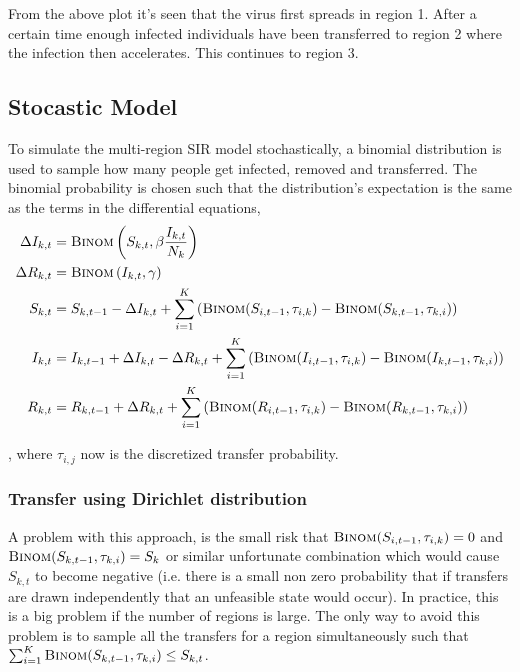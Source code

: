From the above plot it's seen that the virus first spreads in region 1. After a certain time enough infected individuals have been transferred to region 2 where the infection then accelerates. This continues to region 3.

\subsection{Stocastic Model}

To simulate the multi-region SIR model stochastically, a binomial distribution is used to sample how many people get infected, removed and transferred. The binomial probability is chosen such that the distribution's expectation is the same as the terms in the differential equations,
\begin{equation*}
\begin{aligned}
\Delta I_{k,t} &= \textsc{Binom}\left(S_{k,t}, \beta \frac{I_{k, t}}{N_k}\right) \\
\Delta R_{k,t} &= \textsc{Binom}\left(I_{k,t}, \gamma\right) \\
S_{k,t} &= S_{k,t-1} - \Delta I_{k,t} + \sum_{i = 1}^K \left(\textsc{Binom}(S_{i,t-1}, \tau_{i,k}) - \textsc{Binom}(S_{k,t-1}, \tau_{k,i})\right) \\
I_{k,t} &= I_{k,t-1} + \Delta I_{k,t} - \Delta R_{k, t} + \sum_{i = 1}^K \left(\textsc{Binom}(I_{i,t-1}, \tau_{i,k}) - \textsc{Binom}(I_{k,t-1}, \tau_{k,i})\right) \\
R_{k,t} &= R_{k,t-1} + \Delta R_{k, t} + \sum_{i = 1}^K \left(\textsc{Binom}(R_{i,t-1}, \tau_{i,k}) - \textsc{Binom}(R_{k,t-1}, \tau_{k,i})\right)
\end{aligned}
\end{equation*}

, where $\tau_{i,j}$ now is the discretized transfer probability.

\subsubsection{Transfer using Dirichlet distribution}
A problem with this approach, is the small risk that $\textsc{Binom}(S_{i, t-1}, \tau_{i,k}) = 0$ and $\textsc{Binom}(S_{k, t-1}, \tau_{k,i}) = S_k$ or similar unfortunate combination which would cause $S_{k,t}$ to become negative (i.e. there is a small non zero probability that if transfers are drawn independently that an unfeasible state would occur). In practice, this is a big problem if the number of regions is large. The only way to avoid this problem is to sample all the transfers for a region simultaneously such that $\sum_{i = 1}^K \textsc{Binom}(S_{k,t-1}, \tau_{k,i}) \le S_{k, t}$.


